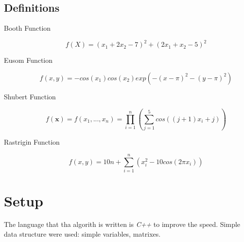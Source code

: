 \documentclass{article}
\begin{document}

\subsection{Definitions}
\label{definitions}
\begin{description}
\item[Booth Function]

\begin{equation}
f(X)=\left(x_1+2x_2-7\right)^2+\left(2x_1+x_2-5\right)^2
\end{equation}

\item[Eusom Function]

\begin{equation}
f(x,y)=−cos(x_1)cos(x_2) exp(−(x − \pi)^2−(y − \pi)^2)
\end{equation}

\item[Shubert Function]

\begin{equation}
f(\mathbf{x})=f(x_1, ...,x_n)=\prod_{i=1}^{n}{\left(\sum_{j=1}^5{ cos((j+1)x_i+j)}\right)}
\end{equation}

\item[Rastrigin Function]

\begin{equation}
f(x, y)=10n + \sum_{i=1}^{n}(x_i^2 - 10cos(2\pi x_i))
\end{equation}

\end{description} 
 

\section{Setup}

	The language that tha algorith is written is \emph{C++} to improve the speed.
Simple data structure were used: simple variables, matrixes.\par
\end{document}
